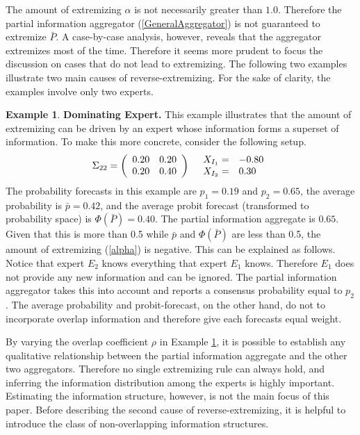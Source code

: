 \documentclass[11pt]{article}
\theoremstyle{definition}
\newtheorem{example}[theorem]{Example}
\theoremstyle{definition}
\begin{document}
The amount of extremizing $\alpha$ is not necessarily greater than $1.0$. Therefore the partial information aggregator (\ref{GeneralAggregator}) is not guaranteed to extremize $\bar{P}$. A case-by-case analysis, however, reveals that the aggregator extremizes most of the time. Therefore it seems more prudent to focus the discussion on cases that do not lead to extremizing. The following two examples illustrate two main causes of reverse-extremizing. For the sake of clarity, the examples involve only two experts. 



\begin{example}
\label{Example1}
\textbf{Dominating Expert.} This example illustrates that the amount of extremizing can be driven by an expert whose information forms a superset of information. To make this more concrete, consider the following setup.
\begin{align*}
\Sigma_{22} =  \left(\begin{array}{c c}
0.20 & 0.20\\
0.20 & 0.40 \\
 \end{array}\right)
  && 
  \begin{array}{l l}
X_{I_1} =& -0.80\\
X_{I_2} =& 0.30
 \end{array}
\end{align*}
The probability forecasts in this example are $p_1 = 0.19$ and $p_2 = 0.65$, the average probability is $\bar{p} = 0.42$, and the average probit forecast (transformed to probability space) is $\Phi(\bar{P}) = 0.40$. 
The partial information aggregate is $0.65$.  Given that this is more than 0.5 while $\bar{p}$ and $\Phi(\bar{P})$ are less than 0.5, the amount of extremizing (\ref{alpha}) is negative. This can be explained as follows. Notice that expert $E_2$ knows everything that expert $E_1$ knows. Therefore $E_1$ does not provide any new information and can be ignored. The partial information aggregator takes this into account and reports a consensus probability equal to $p_2$. The average probability and probit-forecast, on the other hand, do not to incorporate overlap information and therefore give each forecasts equal weight. 
\end{example}

By varying the overlap coefficient $\rho$ in Example \ref{Example1}, it is possible to establish any qualitative relationship between the partial information aggregate and the other two aggregators. Therefore no single extremizing rule can always hold, and inferring the information distribution among the experts is highly important. Estimating the information structure, however, is not the main focus of this paper. Before describing the second cause of reverse-extremizing, it is helpful to introduce the class of non-overlapping information structures. 
\end{document}
